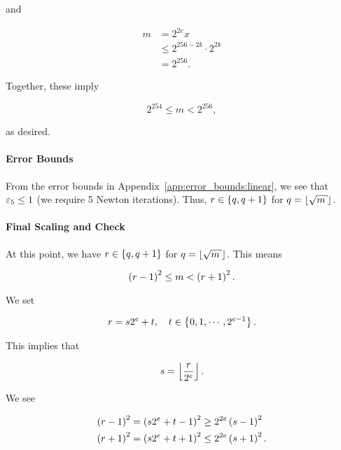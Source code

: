 \noindent
and

\begin{align}
    m &= 2^{2e}x \nonumber\\
        &\le 2^{256 - 2k} \cdot 2^{2k} \nonumber\\
        &= 2^{256}.
\end{align}

\noindent
Together, these imply

\begin{equation}
    2^{254} \le m < 2^{256},
\end{equation}

\noindent
as desired.

\paragraph{Error Bounds}
From the error bounds in Appendix~\ref{app:error_bounds:linear},
we see that $\varepsilon_{5}\le1$ (we require 5 Newton iterations).
Thus, $r\in\left\{ q,q+1 \right\}$ for $q = \floor{\sqrt{m}}$.

\paragraph{Final Scaling and Check}
At this point, we have $r\in\left\{ q,q+1 \right\}$ for $q=\floor{\sqrt{m}}$.
This means

\begin{equation}
    \left( r-1 \right)^{2} \le m < \left( r+1 \right)^{2}.
    \label{eq:app_proof:scaling:final_initial}
\end{equation}

We set

\begin{equation}
    r = s2^{e} + t, \quad t\in\left\{ 0,1,\cdots,2^{e-1} \right\}.
\end{equation}

\noindent
This implies that

\begin{equation}
    s = \left\lfloor \frac{r}{2^{e}} \right\rfloor.
\end{equation}

\noindent
We see

\begin{align}
    \left( r-1 \right)^{2} &= \left( s2^{e} + t - 1 \right)^{2} \ge 2^{2e}\left( s-1 \right)^{2}
        \nonumber\\
    \left( r+1 \right)^{2} &= \left( s2^{e} + t + 1 \right)^{2} \le 2^{2e}\left( s+1 \right)^{2}.
\end{align}

